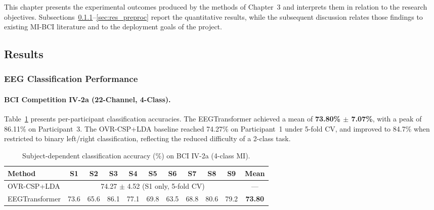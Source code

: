 \documentclass[12pt, a4paper]{article}
\begin{document}
This chapter presents the experimental outcomes produced by the methods of Chapter~3 and interprets them in relation to the research objectives. Subsections~\ref{sec:res_class}--\ref{sec:res_preproc} report the quantitative results, while the subsequent discussion relates those findings to existing MI-BCI literature and to the deployment goals of the project.

\subsection{Results}

\subsubsection{EEG Classification Performance}
\label{sec:res_class}

\paragraph{BCI Competition IV-2a (22-Channel, 4-Class).}

Table~\ref{tab:iv2a_results} presents per-participant classification accuracies. The EEGTransformer achieved a mean of \textbf{73.80\% $\pm$ 7.07\%}, with a peak of 86.11\% on Participant~3. The OVR-CSP+LDA baseline reached 74.27\% on Participant~1 under 5-fold CV, and improved to 84.7\% when restricted to binary left/right classification, reflecting the reduced difficulty of a 2-class task.

\begin{table}[htbp]
\centering
\caption{Subject-dependent classification accuracy (\%) on BCI IV-2a (4-class MI).}
\label{tab:iv2a_results}
\begin{tabular}{lcccccccccc}
\toprule
\textbf{Method} & \textbf{S1} & \textbf{S2} & \textbf{S3} & \textbf{S4} & \textbf{S5} & \textbf{S6} & \textbf{S7} & \textbf{S8} & \textbf{S9} & \textbf{Mean} \\
\midrule
OVR-CSP+LDA & \multicolumn{9}{c}{74.27 $\pm$ 4.52 (S1 only, 5-fold CV)} & --- \\
EEGTransformer & 73.6 & 65.6 & 86.1 & 77.1 & 69.8 & 63.5 & 68.8 & 80.6 & 79.2 & \textbf{73.80} \\
\bottomrule
\end{tabular}
\end{table}
\end{document}
